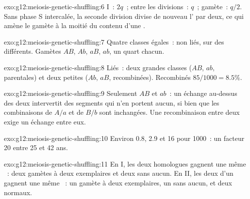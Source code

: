 \begin{solution}{exo:g12:meiosis-genetic-shuffling:6}
 I~: $2q$~; entre les divisions~: $q$~; gamète~: $q/2$. Sans
phase S intercalée, la seconde division divise de nouveau l' par
deux, ce qui amène le gamète à la moitié du contenu d'une 
.
\end{solution}

\begin{solution}{exo:g12:meiosis-genetic-shuffling:7}
Quatre classes égales~:  non liés, sur des  différents.
Gamètes $AB$, $Ab$, $aB$, $ab$, un quart chacun.
\end{solution}

\begin{solution}{exo:g12:meiosis-genetic-shuffling:8}
Liés~: deux grandes classes ($AB$, $ab$, parentales) et deux petites
($Ab$, $aB$, recombinées). Recombinés $85/1000 = 8.5\%$.
\end{solution}

\begin{solution}{exo:g12:meiosis-genetic-shuffling:9}
Seulement $AB$ et $ab$~: un échange au-dessus des deux  intervertit
des segments qui n'en portent aucun, si bien que les combinaisons de
$A/a$ et de $B/b$ sont inchangées. Une recombinaison entre deux 
exige un échange entre eux.
\end{solution}

\begin{solution}{exo:g12:meiosis-genetic-shuffling:10}
Environ 0.8, 2.9 et 16 pour 1000~: un facteur 20 entre 25 et 42 ans.
\end{solution}

\begin{solution}{exo:g12:meiosis-genetic-shuffling:11}
En  I, les deux homologues gagnent une même ~: deux
gamètes à deux exemplaires et deux sans aucun. En  II, les deux
 d'un  gagnent une même ~: un gamète à deux
exemplaires, un sans aucun, et deux normaux.
\end{solution}

